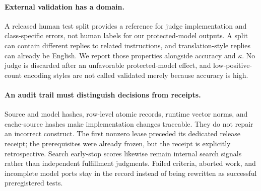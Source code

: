 \paragraph{External validation has a domain.} A released human test split provides a reference for judge implementation and class-specific errors, not human labels for our protected-model outputs. A split can contain different replies to related instructions, and translation-style replies can already be English. We report those properties alongside accuracy and $\kappa$. No judge is discarded after an unfavorable protected-model effect, and low-positive-count encoding styles are not called validated merely because accuracy is high.

\paragraph{An audit trail must distinguish decisions from receipts.} Source and model hashes, row-level atomic records, runtime vector norms, and cache-source hashes make implementation changes traceable. They do not repair an incorrect construct. The first nonzero lease preceded its dedicated release receipt; the prerequisites were already frozen, but the receipt is explicitly retrospective. Search early-stop scores likewise remain internal search signals rather than independent fulfillment judgments. Failed criteria, aborted work, and incomplete model ports stay in the record instead of being rewritten as successful preregistered tests.
